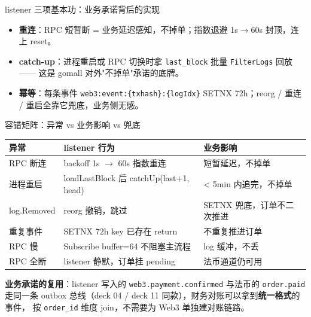 \documentclass[aspectratio=169,11pt]{beamer}
\begin{document}
\begin{frame}[shrink]{listener 三项基本功：业务承诺背后的实现}
\vspace{2mm}
\begin{itemize}
  \item \textbf{重连}：RPC 短暂断 = 业务延迟感知，不掉单；指数退避 1s$\to$60s 封顶，连上 reset。
  \item \textbf{catch-up}：进程重启或 RPC 切换时拿 \texttt{last\_block} 批量 \texttt{FilterLogs} 回放 —— 这是 gomall 对外"不掉单"承诺的底牌。
  \item \textbf{幂等}：每条事件 \texttt{web3:event:\{txhash\}:\{logIdx\}} SETNX 72h；reorg / 重连 / 重启全靠它兜底，业务侧无感。
\end{itemize}
\end{frame}

\begin{frame}[shrink]{容错矩阵：异常 vs 业务影响 vs 兜底}
\centering
{\footnotesize
\begin{tabular}{@{}p{18mm}p{52mm}p{32mm}@{}}
\toprule
异常        & listener 行为                          & 业务影响 \\
\midrule
RPC 断连    & backoff 1s $\to$ 60s 指数重连          & 短暂延迟，不掉单 \\
进程重启    & loadLastBlock 后 catchUp(last+1, head) & < 5min 内追完，不掉单 \\
log.Removed & reorg 撤销，跳过                       & SETNX 兜底，订单不二次推进 \\
重复事件    & SETNX 72h key 已存在 return            & 不重复推进订单 \\
RPC 慢      & Subscribe buffer=64 不阻塞主流程       & log 缓冲，不丢 \\
RPC 全断    & listener 静默，订单挂 pending          & 法币通道仍可用 \\
\bottomrule
\end{tabular}}
\par\smallskip
{\footnotesize \textbf{业务承诺的复用}：listener 写入的 \texttt{web3.payment.confirmed} 与法币的
\texttt{order.paid} 走同一条 outbox 总线（deck 04 / deck 11 同款），财务对账可以拿到\textbf{统一格式}的事件，
按 \texttt{order\_id} 维度 join，不需要为 Web3 单独建对账链路。}
\end{frame}
\end{document}
